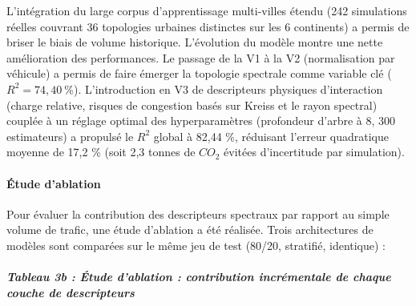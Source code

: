 \documentclass[10pt, a4paper]{article}
\begin{document}
L'intégration du large corpus d'apprentissage multi-villes étendu (242
simulations réelles couvrant 36 topologies urbaines distinctes sur les 6
continents) a permis de briser le biais de volume historique.
L'évolution du modèle montre une nette amélioration des performances. Le
passage de la V1 à la V2 (normalisation par véhicule) a permis de faire
émerger la topologie spectrale comme variable clé
(\(R^2 = 74{,}40\ \%\)). L'introduction en V3 de descripteurs physiques
d'interaction (charge relative, risques de congestion basés sur Kreiss
et le rayon spectral) couplée à un réglage optimal des hyperparamètres
(profondeur d'arbre à 8, 300 estimateurs) a propulsé le \(R^2\) global à
82,44 \%, réduisant l'erreur quadratique moyenne de 17,2 \% (soit 2,3
tonnes de \(CO_2\) évitées d'incertitude par simulation).

\paragraph{Étude d'ablation}\label{uxe9tude-dablation}

Pour évaluer la contribution des descripteurs spectraux par rapport au
simple volume de trafic, une étude d'ablation a été réalisée. Trois
architectures de modèles sont comparées sur le même jeu de test (80/20,
stratifié, identique) :

\subparagraph{Tableau 3b : Étude d'ablation : contribution incrémentale
de chaque couche de
descripteurs}\label{tableau-3b-uxe9tude-dablation-contribution-incruxe9mentale-de-chaque-couche-de-descripteurs}
\end{document}
